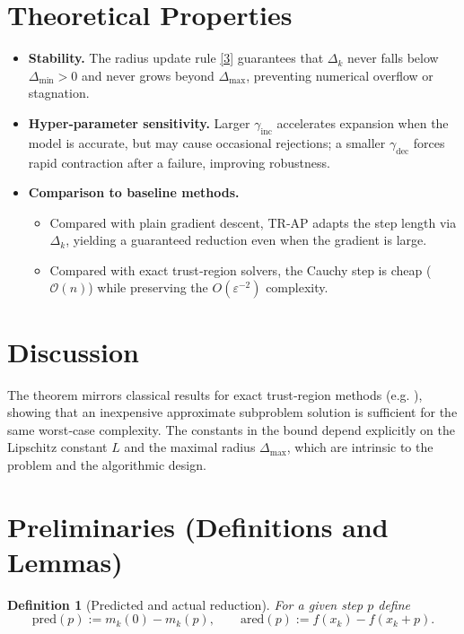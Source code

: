 \documentclass{article}
\newtheorem{definition}{Definition}
\begin{document}
\section*{Theoretical Properties}
\begin{itemize}
\item \textbf{Stability.} The radius update rule \eqref{3} guarantees that $\Delta_{k}$ never falls below $\Delta_{\min}>0$ and never grows beyond $\Delta_{\max}$, preventing numerical overflow or stagnation.
\item \textbf{Hyper‑parameter sensitivity.} Larger $\gamma_{\text{inc}}$ accelerates expansion when the model is accurate, but may cause occasional rejections; a smaller $\gamma_{\text{dec}}$ forces rapid contraction after a failure, improving robustness.
\item \textbf{Comparison to baseline methods.}
    \begin{itemize}
    \item Compared with plain gradient descent, TR‑AP adapts the step length via $\Delta_{k}$, yielding a guaranteed reduction even when the gradient is large.
    \item Compared with exact trust‑region solvers, the Cauchy step is cheap (\(\mathcal{O}(n)\)) while preserving the $O(\varepsilon^{-2})$ complexity.
    \end{itemize}
\end{itemize}

\section*{Discussion}
The theorem mirrors classical results for exact trust‑region methods (e.g. \cite{NocedalWright}), showing that an inexpensive approximate subproblem solution is sufficient for the same worst‑case complexity. The constants in the bound depend explicitly on the Lipschitz constant $L$ and the maximal radius $\Delta_{\max}$, which are intrinsic to the problem and the algorithmic design.

\newpage
\section*{Preliminaries (Definitions and Lemmas)}
\begin{definition}[Predicted and actual reduction]
For a given step $p$ define
\[
\text{pred}(p):=m_{k}(0)-m_{k}(p),\qquad 
\text{ared}(p):=f(x_{k})-f(x_{k}+p).
\]
\end{definition}
\end{document}
